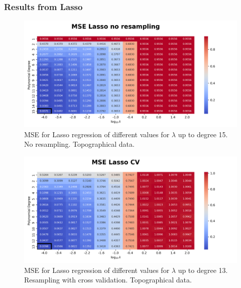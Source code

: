 \documentclass{article}
\begin{document}
\subsubsection{Results from Lasso}
\begin{figure}[htbp]
    \centering
    \includegraphics[width=\textwidth]{Project1/figures/Terrain/Heatmap_MSE_Lasso_no_resampling.png}
    \caption{MSE for Lasso regression of different values for $\lambda$ up to degree 15. No resampling. Topographical data.}
    \label{fig:TerrainLassoNoResamp}
\end{figure}

\begin{figure}[htbp]
    \centering
    \includegraphics[width=\textwidth]{Project1/figures/Terrain/Heatmap_MSE_Lasso_CV.png}
    \caption{MSE for Lasso regression of different values for $\lambda$ up to degree 13. Resampling with cross validation. Topographical data.}
    \label{fig:TerrainLassoCV}
\end{figure}
\end{document}
